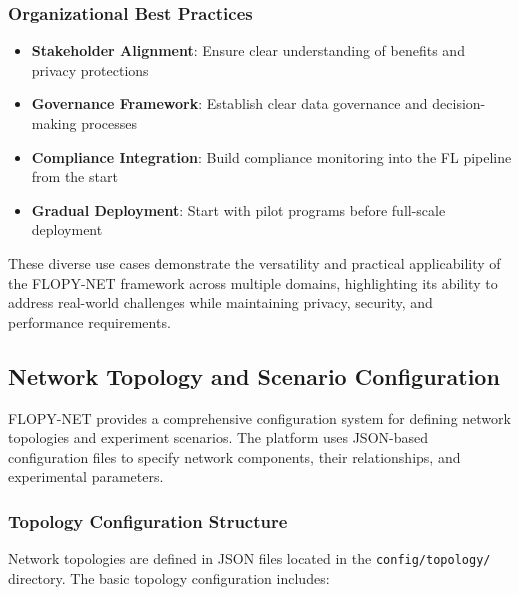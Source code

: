 \subsubsection{Organizational Best Practices}
\begin{itemize}
    \item \textbf{Stakeholder Alignment}: Ensure clear understanding of benefits and privacy protections
    \item \textbf{Governance Framework}: Establish clear data governance and decision-making processes
    \item \textbf{Compliance Integration}: Build compliance monitoring into the FL pipeline from the start
    \item \textbf{Gradual Deployment}: Start with pilot programs before full-scale deployment
\end{itemize}

These diverse use cases demonstrate the versatility and practical applicability of the FLOPY-NET framework across multiple domains, highlighting its ability to address real-world challenges while maintaining privacy, security, and performance requirements.

\subsection{Network Topology and Scenario Configuration}

FLOPY-NET provides a comprehensive configuration system for defining network topologies and experiment scenarios. The platform uses JSON-based configuration files to specify network components, their relationships, and experimental parameters.

\subsubsection{Topology Configuration Structure}

Network topologies are defined in JSON files located in the \texttt{config/topology/} directory. The basic topology configuration includes:


